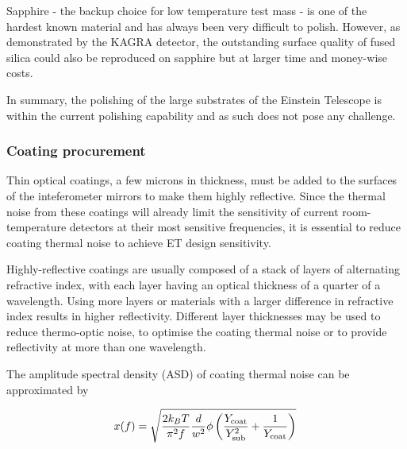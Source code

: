 Sapphire - the backup choice for low temperature test mass - is one of the hardest known material and has always been very difficult to polish. However, as demonstrated by the KAGRA detector, the outstanding surface quality of fused silica could also be reproduced on sapphire \cite{hirose2014sapphire} but at larger time and money-wise costs.

In summary, the polishing of the large substrates of the Einstein Telescope is within the current polishing capability and as such does not pose any challenge.

\subsubsection{Coating procurement}

Thin optical coatings, a few microns in thickness, must be added to the surfaces of the inteferometer mirrors to make them highly reflective. Since the thermal noise from these coatings will already limit the sensitivity of current room-temperature detectors at their most sensitive frequencies, it is essential to reduce coating thermal noise to achieve ET design sensitivity.

Highly-reflective coatings are usually composed of a stack of layers of alternating refractive index, with each layer having an optical thickness of a quarter of a wavelength. Using more layers or materials with a larger difference in refractive index results in higher reflectivity. Different layer thicknesses may be used to reduce thermo-optic noise, to optimise the coating thermal noise or to provide reflectivity at more than one wavelength.

The amplitude spectral density (ASD) of coating thermal noise can be approximated by

\begin{equation}
x(f)=\sqrt{\frac{2 k_B T}{\pi^2 f}\frac{d}{w^2}\phi\left(\frac{Y_{\rm coat}}{Y^2_{\rm sub}} +\frac{1}{Y_{\rm coat}} \right)}\,
\label{equ:CTN}
\end{equation}

